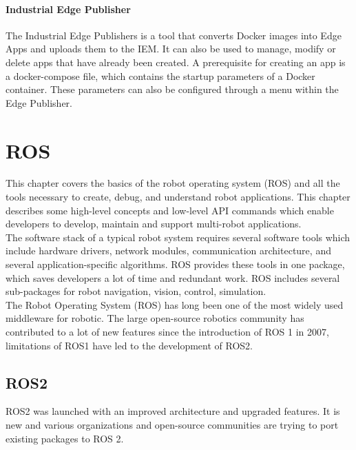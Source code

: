 		\paragraph{Industrial Edge Publisher}
		The Industrial Edge Publishers is a tool that converts Docker images into Edge Apps and uploads them to the IEM. It can also be used to manage, modify or delete apps that have already been created.\cite{siemensIE_App} A prerequisite for creating an app is a docker-compose file, which contains the startup parameters of a Docker container. These parameters can also be configured through a menu within the Edge Publisher.
			

	
	\section{ROS}
	\label{Grundlagen:ROS2}		
	This chapter covers the basics of the robot operating system (ROS) and all the tools necessary to create, debug, and understand robot applications. This chapter describes some high-level concepts and low-level API commands which enable developers to develop, maintain and support multi-robot applications. \\
	
	The software stack of a typical robot system requires several software tools which include hardware drivers, network modules, communication architecture, and several application-specific algorithms. ROS provides these tools in one package, which saves developers a lot of time and redundant work. ROS includes several sub-packages for robot navigation, vision, control, simulation.\\
	
	The Robot Operating System (ROS) has long been one of the most widely used middleware for robotic. The large open-source robotics community has contributed to a lot of new features since the introduction of ROS 1 in 2007, limitations of ROS1 have led to the development of ROS2.\cite{ros2Basic}\\

	\subsection{ROS2} 
	\label{Grundlagen:ROS:ROs2}
	\gls{ROS2} was launched with an improved architecture and upgraded features. It is new and various organizations and open-source communities are trying to port existing packages to ROS 2.\cite{ros2Basic} \\
	
